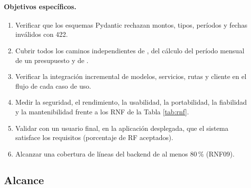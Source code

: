 \paragraph{Objetivos específicos.}
\begin{enumerate}[label=OP\arabic*., leftmargin=1.6cm]
  \item Verificar que los esquemas Pydantic rechazan montos, tipos, períodos y fechas inválidos con 422.
  \item Cubrir todos los caminos independientes de , del cálculo del período mensual de un presupuesto y de .
  \item Verificar la integración incremental de modelos, servicios, rutas y cliente en el flujo de cada caso de uso.
  \item Medir la seguridad, el rendimiento, la usabilidad, la portabilidad, la fiabilidad y la mantenibilidad frente a los RNF de la Tabla \ref{tab:rnf}.
  \item Validar con un usuario final, en la aplicación desplegada, que el sistema satisface los requisitos (porcentaje de RF aceptados).
  \item Alcanzar una cobertura de líneas del backend de al menos 80\,\% (RNF09).
\end{enumerate}

\subsection{Alcance}

